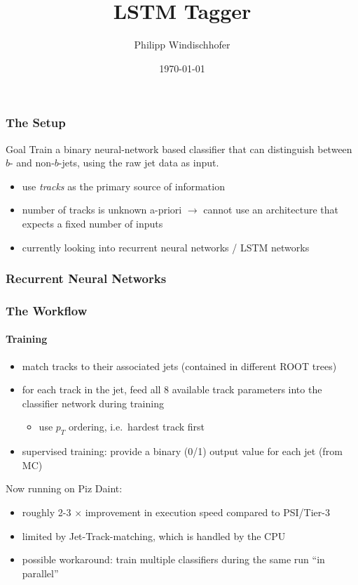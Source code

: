 \documentclass{beamer}
\title{LSTM Tagger}
\author{Philipp Windischhofer}
\date{\today}
\begin{document}
 
\frame{\titlepage}


\begin{frame}
  \frametitle{The Setup}

  \begin{block}{Goal}
    Train a binary neural-network based classifier that can distinguish between $b$- and non-$b$-jets, using the raw jet data as input.
  \end{block}

  \begin{itemize}
  \item use \textsl{tracks} as the primary source of information
  \item number of tracks is unknown a-priori $\rightarrow$ cannot use an architecture that expects a fixed number of inputs
  \item currently looking into recurrent neural networks / LSTM networks
  \end{itemize}
\end{frame}

\begin{frame}
  \frametitle{Recurrent Neural Networks}
\end{frame}

\begin{frame}
  \frametitle{The Workflow}
  \framesubtitle{Training}
  \begin{itemize}
  \item match tracks to their associated jets (contained in different ROOT trees)
  \item for each track in the jet, feed all 8 available track parameters into the classifier network during training
    \begin{itemize}
      \item use $p_T$ ordering, i.e.~hardest track first
    \end{itemize}
  \item supervised training: provide a binary (0/1) output value for each jet (from MC)
  \end{itemize}

  Now running on Piz Daint:
  \begin{itemize}
  \item roughly 2-3 $\times$ improvement in execution speed compared to PSI/Tier-3
  \item limited by Jet-Track-matching, which is handled by the CPU
  \item possible workaround: train multiple classifiers during the same run ``in parallel''
  \end{itemize}
\end{frame}
\end{document}
